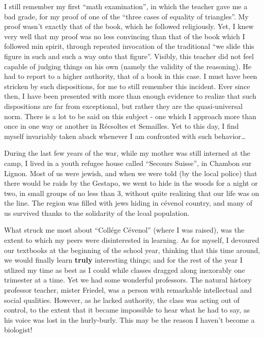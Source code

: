 I still remember my first ``math examination'', in which the teacher gave me a bad grade,
for my proof of one of the ``three cases of equality of triangles''. 
My proof wasn't exactly that of the book, which he followed religiously. 
Yet, I knew very well that my proof was no less convincing than that of the book which I
followed min spirit, through repeated invocation of the traditional
``we slide this figure in such and such a way onto that figure''. 
Visibly, this teacher did not feel capable of judging things on his own (namely the
validity of the reasoning). He had to report to a higher authority, that of a book in this
case. I must have been stricken by such dispositions, for me to still remember this
incident. Ever since then, I have been presented with more than enough evidence to realize
that such dispositions are far from exceptional, but rather they are the quasi-universal
norm. There is a lot to be said on this subject - one which I approach more than once in
one way or another in 
R\'ecsoltes et Semailles. Yet to this day, I find myself invariably 
taken aback whenever I am confronted with such behavior\ldots

During the last few years of the war, while my mother was still interned at the camp, I
lived in a youth refugee house called ``Secours Suisse'', in Chambon sur Lignon. Most of
us were jewish, and when we were told (by the local police) that there would be raids by
the Gestapo, we went to hide in the woods for a night or two, in small groups of no less
than 3, without quite realizing that our life was on the line.
The region was filled with jews hiding in c\'evenol country, and many of us survived
thanks to the solidarity of the lcoal population.

What struck me most about
``Coll\'ege C\'evenol'' (where I was raised), was the extent to which my peers were
disinterested in learning. As for myself, I devoured our textbooks at the beginning of the
school year, thinking that this time around, we would finally learn \textbf{truly}
interesting things; and for 
the rest of the year I utlized my time as best as I could while classes dragged along
inexorably one trimester at a time. Yet we had some wonderful professors. The natural
history professor teacher, mister Friedel, was a person with remarkable intellectual and
social qualities. However, as he lacked authority, the class was acting out of control, to
the extent that it became impossible to hear what he had to say, as his voice was lost in
the hurly-burly. This may be the reason I haven't become a biologist! 


